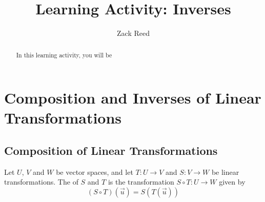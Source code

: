 \documentclass{ximera}
\author{Zack Reed}
\title{Learning Activity: Inverses}
\begin{document}
\begin{abstract}

    In this learning activity, you will be 
\end{abstract}
\maketitle
 
\section*{Composition and Inverses of Linear Transformations}
 
\subsection*{Composition of Linear Transformations}
\begin{definition}\label{def:compoflintrans} Let $U$, $V$ and $W$ be vector spaces, and let $T:U\rightarrow V$ and $S:V\rightarrow W$ be linear transformations.  The  of $S$ and $T$ is the transformation $S\circ T:U\rightarrow W$ given by
$$(S\circ T)(\vec{u})=S(T(\vec{u}))$$
\end{definition}
 
\end{document}
